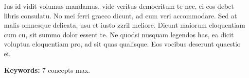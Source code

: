 
Ius id vidit volumus mandamus, vide veritus democritum te nec, ei eos debet libris consulatu. No mei ferri graeco dicunt, ad cum veri accommodare. Sed at malis omnesque delicata, usu et iusto zzril meliore. Dicunt maiorum eloquentiam cum cu, sit summo dolor essent te. Ne quodsi nusquam legendos has, ea dicit voluptua eloquentiam pro, ad sit quas qualisque. Eos vocibus deserunt quaestio ei. 

\textbf{Keywords:} 7 concepts max.
